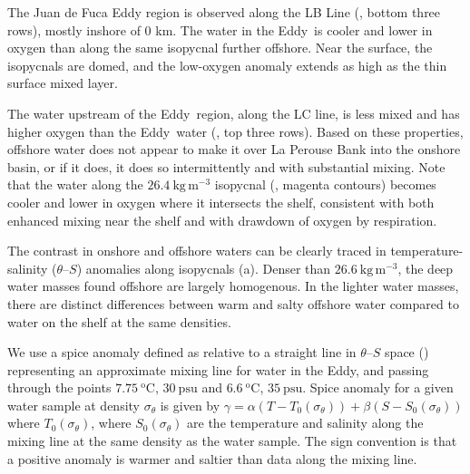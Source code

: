 \documentclass[draft]{agujournal2019}
\newcommand*{\Eddy}{{\sc Eddy}}
\begin{document}
The Juan de Fuca Eddy region is observed along the LB Line (, bottom three rows), mostly inshore of 0 km. The water in the \Eddy\ is cooler and lower in oxygen than along the same isopycnal further offshore.  Near the surface, the isopycnals are domed, and the low-oxygen anomaly extends as high as the thin surface mixed layer.

The water upstream of the \Eddy\ region, along the LC line, is less mixed and has higher oxygen than the \Eddy\ water (, top three rows).  Based on these properties, offshore water does not appear to make it over La Perouse Bank into the onshore basin, or if it does, it does so intermittently and with substantial mixing. Note that the water along the $26.4\ \mathrm{kg\,m^{-3}}$ isopycnal (, magenta contours) becomes cooler and lower in oxygen where it intersects the shelf, consistent with both enhanced mixing near the shelf and with drawdown of oxygen by respiration.

The contrast in onshore and offshore waters can be clearly traced in temperature-salinity ($\theta$--$S$) anomalies along isopycnals (a).  Denser than $26.6\ \mathrm{kg\,m^{-3}}$, the deep water masses found offshore are largely homogenous. In the lighter water masses, there are distinct differences between warm and salty offshore water compared to water on the shelf at the same densities.

We use a spice anomaly defined as relative to a straight line in $\theta$--$S$
space () representing an approximate mixing line for
water in the \Eddy, and passing through the points $7.75\ \mathrm{^oC}$, $30\
\mathrm{psu}$ and $6.6\ \mathrm{^oC}$, $35\ \mathrm{psu}$. Spice anomaly for a
given water sample at density $\sigma_{\theta}$ is given by $\gamma = \alpha
\left(T - T_0\left(\sigma_{\theta}\right)\right) + \beta \left(S -
S_0\left(\sigma_{\theta}\right)\right)$ where
$T_0\left(\sigma_{\theta}\right)$, where $S_0\left(\sigma_{\theta}\right)$ are
the temperature and salinity along the mixing line at the same density as the
water sample. The sign convention is that a positive anomaly is warmer and
saltier than data along the mixing line.
\end{document}
